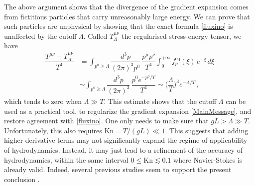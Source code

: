 \documentclass[a4paper, amsfonts, amssymb, amsmath, reprint, showkeys, twoside,notitlepage]{revtex4-2}
\newcommand{\Kn}{\text{Kn}}
\begin{document}
The above argument shows that the divergence of the gradient expansion comes from fictitious particles that carry unreasonably large energy. We can prove that such particles are unphysical by showing that the exact formula \eqref{fluxino} is unaffected by the cutoff $\Lambda$. Called $T^{\mu \nu}_\Lambda$ the regularised stress-energy tensor, we have
\begin{equation}\label{fluxinoCutoff}
\begin{split}
    \dfrac{T^{\mu \nu} {-}T^{\mu \nu}_\Lambda}{T^4} & {=}  \int_{p^0 \geq \Lambda} \dfrac{d^3p}{(2\pi)^3 p^0} \,  \dfrac{p^\mu p^\nu }{T^4}\int_0^{+\infty} \! \! \! \!  f^{\text{eq}}_p (\xi) \, e^{-\xi} \, d\xi \\
    & {\sim} \int_{p^0 \geq \Lambda} \dfrac{d^3p}{(2\pi)^3} \,  \dfrac{p^0 e^{-p^0/T} }{T^4}{\sim} \bigg( \dfrac{\Lambda}{T} \bigg)^3 e^{-\Lambda/T} \, ,
\end{split}
\end{equation}
which tends to zero when $\Lambda {\gg} T$. This estimate shows that the cutoff $\Lambda$ can be used as a practical tool, to regularize the gradient expansion \eqref{MainMessage}, and restore agreement with \eqref{fluxino}. One only needs to make sure that $gL > \Lambda \gg T$. Unfortunately, this also requires $\Kn=T/(gL)\ll 1$. This suggests that adding higher derivative terms may not significantly expand the regime of applicability of hydrodynamics. Instead, it may just lead to a refinement of the accuracy of hydrodynamics, within the same interval $0 \leq \Kn \lesssim 0.1$ where Navier-Stokes is already valid. Indeed, several previous studies seem to support the present conclusion \cite{Geroch2001,Struchup2005,GarciaColin2008,WagnerGavassino2023jgq}.
\end{document}

